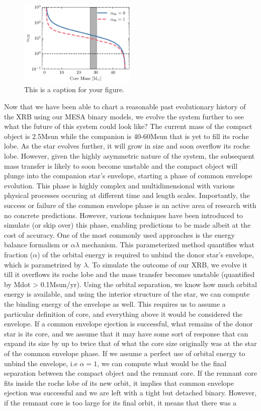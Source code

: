 \documentclass[linenumbers,trackchanges,twocolumn]{aastex701}
\begin{document}
\begin{figure}[htbp]
    \centering
    \includegraphics[width=0.5\textwidth]{xrb_alpha_ce.pdf}
    \caption{This is a caption for your figure.}
    \label{fig:xrb_alpha_ce}
\end{figure}

Now that we have been able to chart a reasonable past evolutionary history of the XRB using our MESA binary models, we evolve the system further to see what the future of this system could look like? The current mass of the compact object is 2.5Msun while the companion is 40-60Msun that is yet to fill its roche lobe. As the star evolves further, it will grow in size and soon overflow its roche lobe. However, given the highly asymmetric nature of the system, the subsequent mass transfer is likely to soon become unstable and the compact object will plunge into the companion star's envelope, starting a phase of common envelope evolution. This phase is highly complex and multidimensional with various physical processes occuring at different time and length scales. Importantly, the success or failure of the common envelope phase is an active area of research with no concrete predictions. However, various techniques have been introduced to simulate (or skip over) this phase, enabling predictions to be made albeit at the cost of accuracy. One of the most commonly used approaches is the energy balance formalism or $\alpha \lambda$ mechanism. This parameterized method quantifies what fraction ($\alpha$) of the orbital energy is required to unbind the donor star's envelope, which is parametrized by $\lambda$. To simulate the outcome of our XRB, we evolve it till it overflows its roche lobe and the mass transfer becomes unstable (quantified by Mdot > 0.1Msun/yr). Using the orbital separation, we know how much orbital energy is available, and using the interior structure of the star, we can compute the binding energy of the envelope as well. This requires us to assume a particular definition of core, and everything above it would be considered the envelope. If a common envelope ejection is successful, what remains of the donor star is its core, and we assume that it may have some sort of response that can expand its size by up to twice that of what the core size originally was at the star of the common envelope phase. If we assume a perfect use of orbital energy to unbind the envelope, i.e $\alpha=1$, we can compute what would be the final separation between the compact object and the remnant core. If the remnant core fits inside the roche lobe of its new orbit, it implies that common envelope ejection was successful and we are left with a tight but detached binary. However, if the remnant core is too large for its final orbit, it means that there was a 
\end{document}
